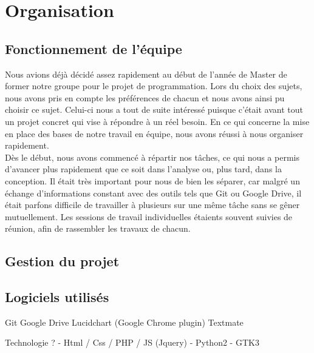 \documentclass[16pts]{report}
\begin{document}

\nocite{*}

\chapter{Organisation}
\label{cha:Organisation}

\section{Fonctionnement de l'équipe}
\label{sec:Fonctionnement de l'équipe}

Nous avions déjà décidé assez rapidement au début de l'année de Master de former notre groupe pour le projet de programmation. Lors du choix des sujets, nous avons pris en compte les préférences de chacun et nous avons ainsi pu choisir ce sujet. Celui-ci nous a tout de suite intéressé puisque c'était avant tout un projet concret qui vise à répondre à un réel besoin.
En ce qui concerne la mise en place des bases de notre travail en équipe, nous avons réussi à nous organiser rapidement. 
\\
Dès le début, nous avons commencé à répartir nos tâches, ce qui nous a permis d’avancer plus rapidement que ce soit dans l’analyse ou, plus tard, dans la conception. Il était très important pour nous de bien les séparer, car malgré un échange d’informations constant avec des outils tels que Git ou Google Drive, il était parfons difficile de travailler à plusieurs sur une même tâche sans se gêner mutuellement. Les sessions de travail individuelles étaients souvent suivies de réunion, afin de rassembler les travaux de chacun.
\\


\section{Gestion du projet}
\label{sec:Gestion du projet}



\section{Logiciels utilisés}
\label{sec:Logiciels utilisés}

	Git
	Google Drive
	Lucidchart (Google Chrome plugin)
	Textmate

	Technologie ?
	- Html / Css / PHP / JS (Jquery)
	- Python2
	- GTK3
\end{document}

